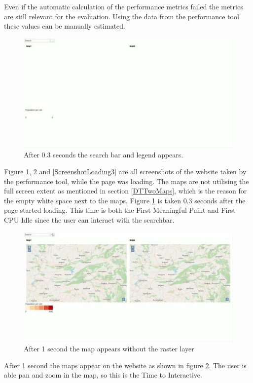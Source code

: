 Even if the automatic calculation of the performance metrics failed the metrics are still relevant for the evaluation. Using the data from the performance tool these values can be manually estimated. 

\begin{figure} [H]
	\centering
	\includegraphics[width=.8\textwidth]{Pictures/ScreenshotLoading1}
	\caption{After 0.3 seconds the search bar and legend appears.}
	\label{ScreenshotLoading1}
\end{figure}

Figure \ref{ScreenshotLoading1}, \ref{ScreenshotLoading2} and \ref{ScreenshotLoading3} are all screenshots of the website taken by the performance tool, while the page was loading. The maps are not utilising the full screen extent as mentioned in section \ref{DTTwoMaps}, which is the reason for the empty white space next to the maps. Figure \ref{ScreenshotLoading1} is taken 0.3 seconds after the page started loading. This time is both the First Meaningful Paint and First CPU Idle since the user can interact with the searchbar.

\begin{figure} [H]
	\centering
	\includegraphics[width=.8\textwidth]{Pictures/ScreenshotLoading2}
	\caption{After 1 second the map appears without the raster layer}
	\label{ScreenshotLoading2}
\end{figure}

After 1 second the maps appear on the website as shown in figure \ref{ScreenshotLoading2}. The user is able pan and zoom in the map, so this is the Time to Interactive. 

